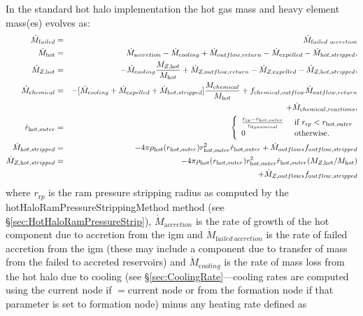 In the standard hot halo implementation the hot gas mass and heavy element mass(es) evolves as:
\begin{eqnarray}
 \dot{M}_{\mathrm failed} &=& \dot{M}_{\mathrm failed~accretion} \\
 \dot{M}_{\mathrm hot} &=& \dot{M}_{\mathrm accretion} - \dot{M}_{\mathrm cooling} + \dot{M}_{\mathrm outflow,return} - \dot{M}_{\mathrm expelled} - \dot{M}_{\mathrm hot, stripped}, \\
 \dot{M}_{Z, {\mathrm hot}} &=& - \dot{M}_{\mathrm cooling} {M_{Z, {\mathrm hot}}\over M_{\mathrm hot}} + \dot{M}_{Z, {\mathrm outflow,return}} - \dot{M}_{Z,{\mathrm expelled}} - \dot{M}_{Z, {\mathrm hot, stripped}}, \\
 \dot{M}_{\mathrm chemical} &=& - [\dot{M}_{\mathrm cooling} + \dot{M}_{\mathrm expelled} + \dot{M}_{\mathrm hot, stripped}] {M_{\mathrm chemical}\over M_{\mathrm hot}} + f_{\mathrm chemical,outflow} \dot{M}_{\mathrm outflow,return} \nonumber \\ 
& & + \dot{M}_{\mathrm chemical,reactions}, \\
\dot{r}_{\mathrm hot, outer} &=& \left\{ \begin{array}{ll} {r_{\mathrm rp} - r_{\mathrm hot, outer} \over \tau_{\mathrm dynamical}} & \hbox{ if } r_{\mathrm rp} < r_{\mathrm hot, outer} \\ 0 & \hbox{ otherwise.} \end{array} \right. \\
\dot{M}_{\mathrm hot, stripped} &=& -4 \pi \rho_{\mathrm hot}(r_{\mathrm hot, outer}) r_{\mathrm hot, outer}^2 \dot{r}_{\mathrm hot, outer} + \dot{M}_{\mathrm outflows} f_{\mathrm outflow, stripped} \\
\dot{M}_{Z, {\mathrm hot, stripped}} &=& -4 \pi \rho_{\mathrm hot}(r_{\mathrm hot, outer}) r_{\mathrm hot, outer}^2 \dot{r}_{\mathrm hot, outer} (M_{Z, {\mathrm hot}} / M_{\mathrm hot}) \nonumber \\
 & & + \dot{M}_{Z, {\mathrm outflows}} f_{\mathrm outflow, stripped}  
\end{eqnarray}
where $r_{\mathrm rp}$ is the ram pressure stripping radius as computed by the {\normalfont \ttfamily hotHaloRamPressureStrippingMethod} method (see \S\ref{sec:HotHaloRamPressureStrip}), $\dot{M}_{\mathrm accretion}$ is the rate of growth of the hot \gls{component} due to accretion from the \gls{igm} and $\dot{M}_{\mathrm failed~accretion}$ is the rate of failed accretion from the \gls{igm} (these may include a \gls{component} due to transfer of mass from the failed to accreted reservoirs) and $\dot{M}_{\mathrm cooling}$ is the rate of mass loss from the hot halo due to cooling (see \S\ref{sec:CoolingRate}---cooling rates are computed using the current \gls{node} if {\normalfont \ttfamily [hotHaloCoolingFromNode]}$=${\normalfont \ttfamily current node} or from the formation \gls{node} if that parameter is set to {\normalfont \ttfamily formation node}) minus any heating rate defined as
